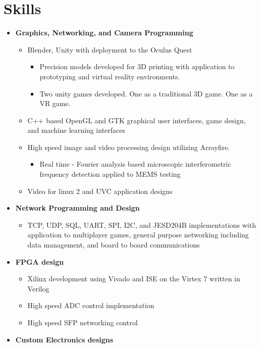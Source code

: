 \documentclass[10pt]{extarticle}
\theoremstyle{plain}
\theoremstyle{Definition}
\theoremstyle{Definition}
\theoremstyle{plain}
\begin{document}
	\section{Skills}
		\begin{itemize}
			\item \textbf{Graphics, Networking, and Camera Programming}
			\begin{itemize} 
				\item Blender, Unity with deployment to the Oculus Quest
				\begin{itemize}
					\item Precision models developed for 3D printing with application to prototyping and virtual reality environments. 
					\item Two unity games developed. One as a traditional 3D game. One as a VR game. 
				\end{itemize}
				\item C++ based OpenGL and GTK graphical user interfaces, game design, and machine learning interfaces
				\item High speed image and video processing design utilizing Arrayfire. 
				\begin{itemize}
					\item Real time - Fourier analysis based microscopic interferometric frequency detection applied to MEMS testing
				\end{itemize}					
				\item Video for linux 2 and UVC application designs
			\end{itemize}
			\item \textbf{Network Programming and Design}
			\begin{itemize}
				\item TCP, UDP, SQL, UART, SPI, I2C, and 
				JESD204B implementations with application to multiplayer games, general purpose networking including data management, and board to board communications
			\end{itemize}
			\item \textbf{FPGA design}
			\begin{itemize}
				\item Xilinx development using Vivado and ISE on the Virtex 7 written in Verilog
				\item High speed ADC control implementation
				\item High speed SFP networking control
			\end{itemize}
			\item \textbf{Custom Electronics designs}

\end{itemize}
\end{document}

